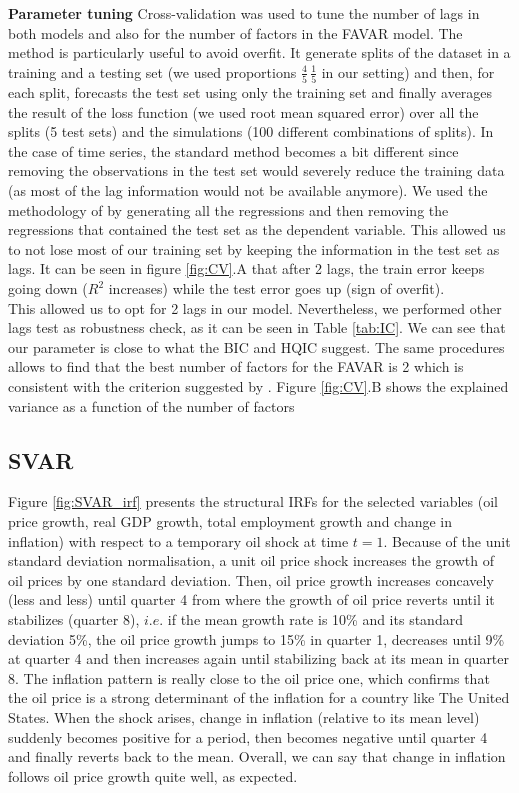 \documentclass[11pt,a4paper]{article}
\begin{document}
\textbf{Parameter tuning }  Cross-validation was used to tune the number of lags in both models and also for the number of factors in the FAVAR model. The method is particularly useful to avoid overfit. It generate splits of the dataset in a training and a testing set (we used proportions $\frac{4}{5} \, \frac{1}{5}$ in our setting) and then, for each split, forecasts the test set using only the training set and finally averages the result of the loss function (we used root mean squared error) over all the splits (5 test sets) and the simulations (100 different combinations of splits). In the case of time series, the standard method becomes a bit different since removing the observations in the test set would severely reduce the training data (as most of the lag information would not be available anymore). We used the methodology of \cite{bergmeir} by generating all the regressions and then removing the regressions that contained the test set as the dependent variable. This allowed us to not lose most of our training set by keeping the information in the test set as lags. It can be seen in figure \ref{fig:CV}.A that after 2 lags, the train error keeps going down ($R^2$ increases) while the test error goes up (sign of overfit). \\
This allowed us to opt for 2 lags in our model. Nevertheless, we performed other lags test as robustness check, as it can be seen in Table \ref{tab:IC}. We can see that our parameter is close to what the BIC and HQIC suggest. The same procedures allows to find that the best number of factors for the FAVAR is 2 which is consistent with the criterion suggested by \cite{onatski2010determining}. Figure \ref{fig:CV}.B shows the explained variance as a function of the number of factors

\subsection{SVAR}

Figure \ref{fig:SVAR_irf} presents the structural IRFs for the selected variables (oil price growth, real GDP growth, total employment growth and change in inflation) with respect to a temporary oil shock at time $t =1$. Because of the unit standard deviation normalisation, a unit oil price shock increases the growth of oil prices by one standard deviation. Then, oil price growth increases concavely (less and less) until quarter 4 from where the growth of oil price reverts until it stabilizes (quarter 8), $i.e.$ if the mean growth rate is 10\% and its standard deviation 5\%, the oil price growth jumps to 15\% in quarter 1, decreases until 9\%  at quarter 4 and then increases again until stabilizing back at its mean in quarter 8.
The inflation pattern is really close to the oil price one, which confirms that the oil price is a strong determinant of the inflation for a country like The United States. When the shock arises, change in inflation (relative to its mean level) suddenly becomes positive for a period, then becomes negative until quarter 4 and finally reverts back to the mean. Overall, we can say that change in inflation follows oil price growth quite well, as expected.
\end{document}
